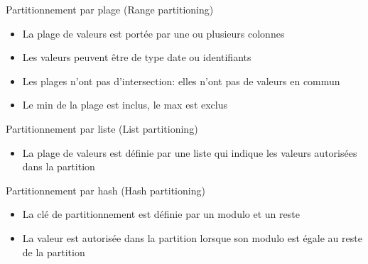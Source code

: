 
\begin{frame}[fragile]{Partitionnement par plage (Range partitioning)}

   \begin{itemize}
      \item La plage de valeurs est portée par une ou plusieurs colonnes
      \item Les valeurs peuvent être de type date ou identifiants
      \item Les plages n'ont pas d'intersection: elles n'ont pas de valeurs en commun
      \item Le min de la plage est inclus, le max est exclus
   \end{itemize}

\end{frame}


\begin{frame}[fragile]{Partitionnement par liste (List partitioning)}

   \begin{itemize}
      \item La plage de valeurs est définie par une liste qui indique les valeurs autorisées dans la partition
   \end{itemize}

\end{frame}


\begin{frame}[fragile]{Partitionnement par hash (Hash partitioning)}

   \begin{itemize}
      \item La clé de partitionnement est définie par un modulo et un reste
      \item La valeur est autorisée dans la partition lorsque son modulo est égale au reste de la partition
   \end{itemize}

\end{frame}


